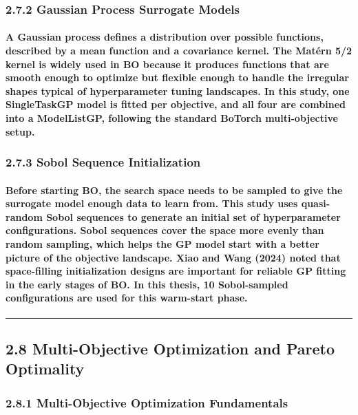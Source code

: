 \subsubsection{2.7.2 Gaussian Process Surrogate
Models}\label{gaussian-process-surrogate-models}

\paragraph{A Gaussian process defines a distribution over possible functions, described by a mean function and a covariance kernel. The Matérn 5/2 kernel is widely used in BO because it produces functions that are smooth enough to optimize but flexible enough to handle the irregular shapes typical of hyperparameter tuning landscapes. In this study, one SingleTaskGP model is fitted per objective, and all four are combined into a ModelListGP, following the standard BoTorch multi-objective setup.}

\subsubsection{2.7.3 Sobol Sequence
Initialization}\label{sobol-sequence-initialization}

\paragraph{Before starting BO, the search space needs to be sampled to give the surrogate model enough data to learn from. This study uses quasi-random Sobol sequences to generate an initial set of hyperparameter configurations. Sobol sequences cover the space more evenly than random sampling, which helps the GP model start with a better picture of the objective landscape. Xiao and Wang (2024) noted that space-filling initialization designs are important for reliable GP fitting in the early stages of BO. In this thesis, 10 Sobol-sampled configurations are used for this warm-start phase.}

\begin{center}\rule{0.5\linewidth}{0.5pt}\end{center}

\subsection{2.8 Multi-Objective Optimization and Pareto
Optimality}\label{multi-objective-optimization-and-pareto-optimality}

\subsubsection{2.8.1 Multi-Objective Optimization
Fundamentals}\label{multi-objective-optimization-fundamentals}

